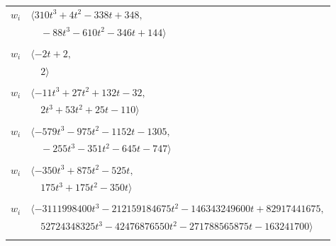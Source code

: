 \documentclass[11pt]{article}
\begin{document}
\begin{longtable}{@{}ll@{}}
$w_i$ & $\langle 310t^{3}+4t^{2}-338t+348,$\\
 & $\quad -88t^{3}-610t^{2}-346t+144\rangle$\\
\addlinespace[2pt]
\multicolumn{2}{@{}p{0.97\textwidth}@{}}{$i=83$, $D_i=1$, $\rho_{ij}$: $77{:}2, \allowbreak 82{:}1$}\\
$w_i$ & $\langle -2t+2,$\\
 & $\quad 2\rangle$\\
\addlinespace[2pt]
\multicolumn{2}{@{}p{0.97\textwidth}@{}}{$i=84$, $D_i=1$, $\rho_{ij}$: $2{:}1, \allowbreak 17{:}2, \allowbreak 19{:}1, \allowbreak 27{:}1, \allowbreak 34{:}2, \allowbreak 39{:}1, \allowbreak 60{:}2, \allowbreak 67{:}2, \allowbreak 81{:}2$}\\
$w_i$ & $\langle -11t^{3}+27t^{2}+132t-32,$\\
 & $\quad 2t^{3}+53t^{2}+25t-110\rangle$\\
\addlinespace[2pt]
\multicolumn{2}{@{}p{0.97\textwidth}@{}}{$i=85$, $D_i=1$, $\rho_{ij}$: $4{:}1, \allowbreak 5{:}1, \allowbreak 17{:}1, \allowbreak 19{:}1, \allowbreak 26{:}2, \allowbreak 30{:}2, \allowbreak 31{:}2, \allowbreak 36{:}2, \allowbreak 65{:}1, \allowbreak 75{:}1, \allowbreak 77{:}2, \allowbreak 87{:}1$}\\
$w_i$ & $\langle -579t^{3}-975t^{2}-1152t-1305,$\\
 & $\quad -255t^{3}-351t^{2}-645t-747\rangle$\\
\addlinespace[2pt]
\multicolumn{2}{@{}p{0.97\textwidth}@{}}{$i=86$, $D_i=1$, $\rho_{ij}$: $0{:}1, \allowbreak 1{:}2, \allowbreak 17{:}2, \allowbreak 18{:}2, \allowbreak 36{:}2, \allowbreak 65{:}1, \allowbreak 78{:}1$}\\
$w_i$ & $\langle -350t^{3}+875t^{2}-525t,$\\
 & $\quad 175t^{3}+175t^{2}-350t\rangle$\\
\addlinespace[2pt]
\multicolumn{2}{@{}p{0.97\textwidth}@{}}{$i=87$, $D_i=1$, $\rho_{ij}$: $4{:}2, \allowbreak 5{:}2, \allowbreak 18{:}2, \allowbreak 26{:}1, \allowbreak 27{:}2, \allowbreak 30{:}2, \allowbreak 40{:}2, \allowbreak 42{:}1, \allowbreak 53{:}1, \allowbreak 63{:}1, \allowbreak 68{:}2, \allowbreak 69{:}2, \allowbreak 73{:}2, \allowbreak 75{:}2, \allowbreak 85{:}2, \allowbreak 89{:}1$}\\
$w_i$ & $\langle -3111998400t^{3}-212159184675t^{2}-146343249600t+82917441675,$\\
 & $\quad 52724348325t^{3}-42476876550t^{2}-271788565875t-163241700\rangle$\\
\addlinespace[2pt]

\end{longtable}
\end{document}
